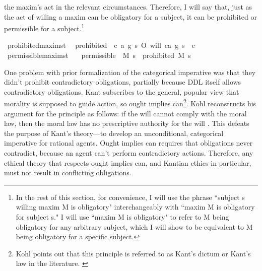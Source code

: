 \begin{isabellebody}
\begin{isamarkuptext}
the maxim's act in the relevant circumstances. Therefore, I will say that, just as the act of willing a
 maxim can be obligatory for a subject, it can be prohibited or permissible for a subject.\footnote{In 
the rest of this section, for convenience, I will use the phrase ``subject s willing maxim M is obligatory" 
interchangeably with ``maxim M is obligatory for subject s." I will use ``maxim M is obligatory" to 
refer to M being obligatory for any arbitrary subject, which I will show to be equivalent to M being 
obligatory for a specific subject.}%
\end{isamarkuptext}\isamarkuptrue%
\isamarkupfalse%
\ prohibited{\isacharcolon}{\isacharcolon}{\isachardoublequoteopen}maxim{\isasymRightarrow}s{\isasymRightarrow}t{\isachardoublequoteclose}\ \ \isanewline
{\isachardoublequoteopen}prohibited\ {\isasymequiv}\ {\isasymlambda}{\isacharparenleft}c{\isacharcomma}\ a{\isacharcomma}\ g{\isacharparenright}\ s{\isachardot}\ O{\isacharbraceleft}\isactrlbold {\isasymnot}\ {\isacharparenleft}will\ {\isacharparenleft}c{\isacharcomma}a{\isacharcomma}\ g{\isacharparenright}\ s{\isacharparenright}\ {\isacharbar}\ c{\isacharbraceright}{\isachardoublequoteclose}\isanewline
\isanewline
{}\isamarkupfalse%
\ permissible{\isacharcolon}{\isacharcolon}{\isachardoublequoteopen}maxim{\isasymRightarrow}s{\isasymRightarrow}t{\isachardoublequoteclose}\isanewline
\ \ \ {\isachardoublequoteopen}permissible\ {\isasymequiv}\ {\isasymlambda}M\ s{\isachardot}\ \isactrlbold {\isasymnot}\ {\isacharparenleft}prohibited\ M\ s{\isacharparenright}{\isachardoublequoteclose}\isanewline
%
%
\begin{isamarkuptext}%
One problem with prior formalization of the categorical imperative was that they didn't
prohibit contradictory obligations, partially because DDL itself allows contradictory obligations. 
Kant subscribes to the general, popular view that morality is supposed to guide action, so ought implies 
can\footnote{Kohl points out that this principle is referred to as 
Kant's dictum or Kant's law in the literature. \cite[footnote 1]{kohl}}. Kohl reconstructs his argument for the principle as 
follows: if the will cannot comply with the moral law, then the moral law has no prescriptive authority 
for the will \cite[703-4]{kohl}. This defeats the purpose of Kant's theory—to develop an unconditional, categorical imperative 
for rational agents. Ought implies can requires that obligations never contradict, because an agent 
can't perform contradictory actions. Therefore, any ethical theory that respects ought implies can, 
and Kantian ethics in particular, must not result in conflicting obligations.


\end{isamarkuptext}
\end{isabellebody}
